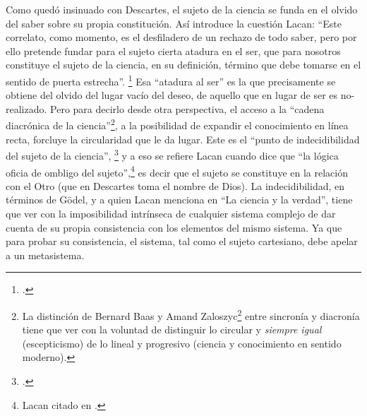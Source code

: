 Como quedó insinuado con Descartes, el sujeto de la ciencia se funda en el olvido del saber sobre su propia constitución. Así introduce la cuestión Lacan: \enquote{Este correlato, como momento, es el desfiladero de un rechazo de todo saber, pero por ello pretende fundar para el sujeto cierta atadura en el ser, que para nosotros constituye el sujeto de la ciencia, en su definición, término que debe tomarse en el sentido de puerta estrecha}. \footcite[][835]{@7117-LACAN1984} Esa \enquote{atadura al ser} es la que precisamente se obtiene del olvido del lugar vacío del deseo, de aquello que en lugar de ser es no-realizado. Pero para decirlo desde otra perspectiva, el acceso a la \enquote{cadena diacrónica de la ciencia}\footnote{La distinción de Bernard Baas y Amand Zaloszyc\footcite[][24-25]{@7118-BAAS1994} entre sincronía y diacronía tiene que ver con la voluntad de distinguir lo circular y \emph{siempre igual} (escepticismo) de lo lineal y progresivo (ciencia y conocimiento en sentido moderno).}, a la posibilidad de expandir el conocimiento en línea recta, forcluye la circularidad que le da lugar. Este es el \enquote{punto de indecidibilidad del sujeto de la ciencia}, \footcite[][24]{@7118-BAAS1994} y a eso se refiere Lacan cuando dice que \enquote{la lógica oficia de ombligo del sujeto},\footnote{Lacan citado en \cite[][]{@7118-BAAS1994}.} es decir que el sujeto se constituye en la relación con el Otro (que en Descartes toma el nombre de Dios). La indecidibilidad, en términos de Gödel, y a quien Lacan menciona en \enquote{La ciencia y la verdad}, tiene que ver con la imposibilidad intrínseca de cualquier sistema complejo de dar cuenta de su propia consistencia con los elementos del mismo sistema. Ya que para probar su consistencia, el sistema, tal como el sujeto cartesiano, debe apelar a un metasistema.

